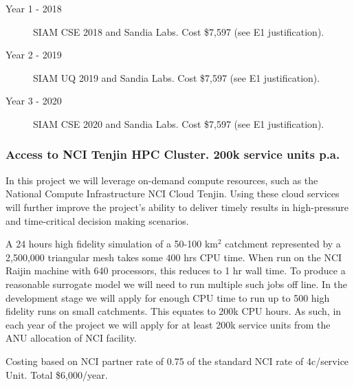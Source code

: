 \documentclass[a4paper,twoside,12pt,compact]{article}
\begin{document}
\begin{description}
\item[Year 1 - 2018] SIAM CSE 2018 and Sandia Labs.  Cost \$7,597   (see E1 justification).

\item[Year 2 - 2019] SIAM UQ 2019 and Sandia Labs.  Cost \$7,597  (see E1 justification).

\item[Year 3 - 2020]  SIAM CSE 2020 and Sandia Labs.  Cost \$7,597   (see E1 justification).

\end{description}








\subsubsection*{Access to NCI Tenjin HPC Cluster. 200k service units p.a.}

In this project we will leverage on-demand compute resources, 
such as the National Compute Infrastructure NCI Cloud Tenjin. 
Using these cloud services will further improve the project's 
ability to deliver timely results in high-pressure and 
time-critical decision making scenarios.

A 24 hours high fidelity simulation of a 50-100 km$^2$ catchment 
represented by a 2,500,000 triangular mesh takes 
some 400 hrs  CPU time. When run on the NCI Raijin machine 
with 640 processors, this reduces to 1 hr wall time.
To produce a reasonable surrogate model we will need to run multiple
such jobs off line.  
In the development stage we will apply for enough CPU time
to run up to 500 high fidelity runs on small catchments. 
This equates to 200k CPU hours.   
As such, in each year of the project we will apply for at least
200k service units from the ANU allocation of NCI facility.  

Costing based on NCI partner rate of 0.75  of the standard 
NCI rate of 4c/service Unit. Total \$6,000/year. 
\end{document}
